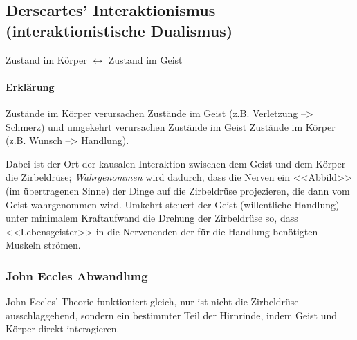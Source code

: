 \documentclass[../main.tex]{subfiles}
\begin{document}
\subsection{Derscartes' Interaktionismus (interaktionistische Dualismus)}
\begin{warningbox}
	Zustand im Körper $\longleftrightarrow$ Zustand im Geist
\end{warningbox}

\paragraph{Erklärung}Zustände im Körper verursachen Zustände im Geist (z.B. Verletzung --> Schmerz) und umgekehrt verursachen Zustände im Geist Zustände im Körper (z.B. Wunsch --> Handlung).

Dabei ist der Ort der kausalen Interaktion zwischen dem Geist und dem Körper die Zirbeldrüse; \textit{Wahrgenommen} wird dadurch, dass die Nerven ein <<Abbild>> (im übertragenen Sinne) der Dinge auf die Zirbeldrüse projezieren, die dann vom Geist wahrgenommen wird. Umkehrt steuert der Geist (willentliche Handlung) unter minimalem Kraftaufwand die Drehung der Zirbeldrüse so, dass <<Lebensgeister>> in die Nervenenden der für die Handlung benötigten Muskeln strömen.

\subsubsection{John Eccles Abwandlung}
John Eccles' Theorie funktioniert gleich, nur ist nicht die Zirbeldrüse ausschlaggebend, sondern ein bestimmter Teil der Hirnrinde, indem Geist und Körper direkt interagieren.
\end{document}
